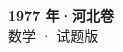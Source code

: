 \documentclass[zihao=-4, a4paper]{ctexart}
\begin{document}
\begin{center}
  {\Large\bfseries 1977 年·河北卷}\\[4pt]
  {\large 数学 · 试题版}
\end{center}
\medskip
{}

\end{document}
